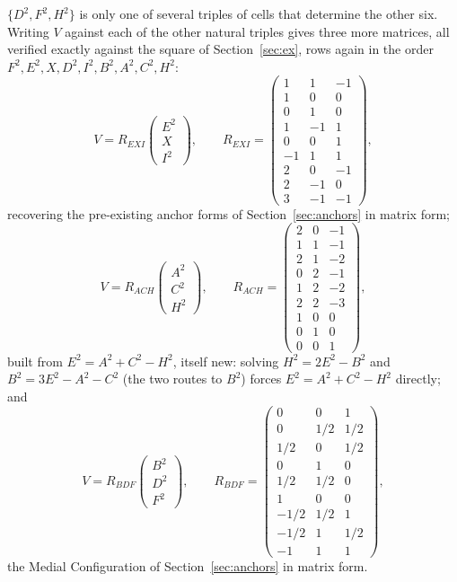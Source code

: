 \documentclass[12pt]{article}
\theoremstyle{remark}
\begin{document}
$\{D^2, F^2, H^2\}$ is only one of several triples of cells that
determine the other six. Writing $V$ against each of the other
natural triples gives three more matrices, all verified exactly
against the square of Section~\ref{sec:ex}, rows again in the order
$F^2, E^2, X, D^2, I^2, B^2, A^2, C^2, H^2$:
\[
V = R_{EXI} \begin{pmatrix} E^2 \\ X \\ I^2 \end{pmatrix} ,
\qquad
R_{EXI} =
\begin{pmatrix}
1 & 1 & -1 \\ 1 & 0 & 0 \\ 0 & 1 & 0 \\ 1 & -1 & 1 \\ 0 & 0 & 1 \\
-1 & 1 & 1 \\ 2 & 0 & -1 \\ 2 & -1 & 0 \\ 3 & -1 & -1
\end{pmatrix} ,
\]
recovering the pre-existing anchor forms of Section~\ref{sec:anchors}
in matrix form;
\[
V = R_{ACH} \begin{pmatrix} A^2 \\ C^2 \\ H^2 \end{pmatrix} ,
\qquad
R_{ACH} =
\begin{pmatrix}
2 & 0 & -1 \\ 1 & 1 & -1 \\ 2 & 1 & -2 \\ 0 & 2 & -1 \\ 1 & 2 & -2 \\
2 & 2 & -3 \\ 1 & 0 & 0 \\ 0 & 1 & 0 \\ 0 & 0 & 1
\end{pmatrix} ,
\]
built from $E^2 = A^2+C^2-H^2$, itself new: solving $H^2=2E^2-B^2$
and $B^2=3E^2-A^2-C^2$ (the two routes to $B^2$) forces
$E^2 = A^2+C^2-H^2$ directly; and
\[
V = R_{BDF} \begin{pmatrix} B^2 \\ D^2 \\ F^2 \end{pmatrix} ,
\qquad
R_{BDF} =
\begin{pmatrix}
0 & 0 & 1 \\ 0 & 1/2 & 1/2 \\ 1/2 & 0 & 1/2 \\ 0 & 1 & 0 \\
1/2 & 1/2 & 0 \\ 1 & 0 & 0 \\ -1/2 & 1/2 & 1 \\ -1/2 & 1 & 1/2 \\
-1 & 1 & 1
\end{pmatrix} ,
\]
the Medial Configuration of Section~\ref{sec:anchors} in matrix form.
\end{document}
